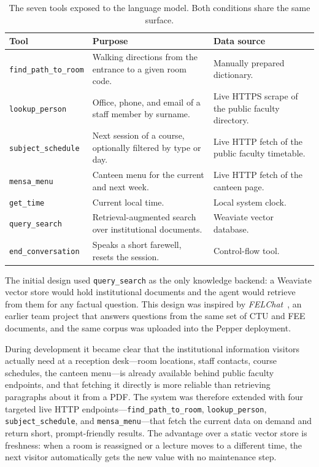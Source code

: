 \begin{table}[h]
\centering
\small
\begin{tabular}{l p{4.8cm} p{4.5cm}}
\hline
\textbf{Tool} & \textbf{Purpose} & \textbf{Data source} \\
\hline
\texttt{find\_path\_to\_room} & Walking directions from the entrance to a given room code. & Manually prepared dictionary. \\
\texttt{lookup\_person} & Office, phone, and email of a staff member by surname. & Live HTTPS scrape of the public faculty directory. \\
\texttt{subject\_schedule} & Next session of a course, optionally filtered by type or day. & Live HTTP fetch of the public faculty timetable. \\
\texttt{mensa\_menu} & Canteen menu for the current and next week. & Live HTTP fetch of the canteen page. \\
\texttt{get\_time} & Current local time. & Local system clock. \\
\texttt{query\_search} & Retrieval-augmented search over institutional documents. & Weaviate vector database. \\
\texttt{end\_conversation} & Speaks a short farewell, resets the session. & Control-flow tool. \\
\hline
\end{tabular}
\caption{The seven tools exposed to the language model. Both conditions share the same surface.}
\label{tab:tools}
\end{table}

The initial design used \texttt{query\_search} as the only knowledge backend: a Weaviate vector store would hold institutional documents and the agent would retrieve from them for any factual question.
This design was inspired by \emph{FELChat}~\cite{felchat-repo}, an earlier team project that answers questions from the same set of CTU and FEE documents, and the same corpus was uploaded into the Pepper deployment.

During development it became clear that the institutional information visitors actually need at a reception desk---room locations, staff contacts, course schedules, the canteen menu---is already available behind public faculty endpoints, and that fetching it directly is more reliable than retrieving paragraphs about it from a PDF.
The system was therefore extended with four targeted live HTTP endpoints---\texttt{find\_path\_to\_room}, \texttt{lookup\_person}, \texttt{subject\_schedule}, and \texttt{mensa\_menu}---that fetch the current data on demand and return short, prompt-friendly results.
The advantage over a static vector store is freshness: when a room is reassigned or a lecture moves to a different time, the next visitor automatically gets the new value with no maintenance step.

